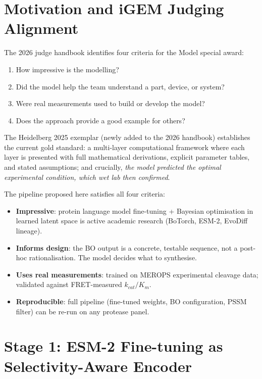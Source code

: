 \documentclass[10pt,a4paper]{article}
\begin{document}
\section{Motivation and iGEM Judging Alignment}

The 2026 judge handbook identifies four criteria for the Model special award:
\begin{enumerate}[topsep=2pt,itemsep=1pt,leftmargin=*]
  \item How impressive is the modelling?
  \item Did the model help the team understand a part, device, or system?
  \item Were real measurements used to build or develop the model?
  \item Does the approach provide a good example for others?
\end{enumerate}

The Heidelberg 2025 exemplar (newly added to the 2026 handbook) establishes the
current gold standard: a multi-layer computational framework where each layer is
presented with full mathematical derivations, explicit parameter tables, and
stated assumptions; and crucially, \emph{the model predicted the optimal
experimental condition, which wet lab then confirmed}.

The pipeline proposed here satisfies all four criteria:

\begin{itemize}[topsep=2pt,itemsep=2pt,leftmargin=*]
  \item \textbf{Impressive}: protein language model fine-tuning + Bayesian
    optimisation in learned latent space is active academic research
    (BoTorch, ESM-2, EvoDiff lineage).
  \item \textbf{Informs design}: the BO output is a concrete, testable sequence,
    not a post-hoc rationalisation.  The model decides what to synthesise.
  \item \textbf{Uses real measurements}: trained on MEROPS experimental cleavage
    data; validated against FRET-measured $k_{cat}/K_m$.
  \item \textbf{Reproducible}: full pipeline (fine-tuned weights, BO configuration,
    PSSM filter) can be re-run on any protease panel.
\end{itemize}

\section{Stage 1: ESM-2 Fine-tuning as Selectivity-Aware Encoder}
\end{document}
